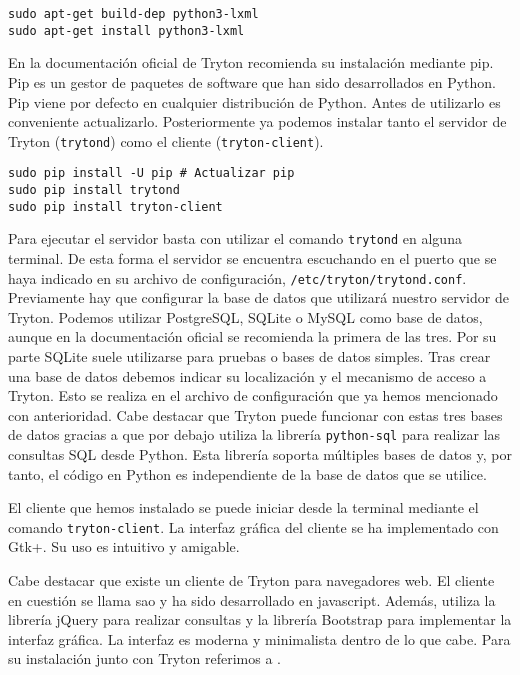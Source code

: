 \documentclass{article}
\begin{document}
\begin{verbatim}
sudo apt-get build-dep python3-lxml
sudo apt-get install python3-lxml
\end{verbatim}

En la documentación oficial de Tryton recomienda su instalación mediante pip. Pip es un gestor de paquetes de software que han sido desarrollados en Python.  Pip viene por defecto en cualquier distribución de Python. Antes de utilizarlo es conveniente actualizarlo. Posteriormente ya podemos instalar tanto el servidor de Tryton (\texttt{trytond}) como el cliente (\texttt{tryton-client}).

\begin{verbatim}
sudo pip install -U pip # Actualizar pip
sudo pip install trytond
sudo pip install tryton-client
\end{verbatim}

Para ejecutar el servidor basta con utilizar el comando \texttt{trytond} en alguna terminal. De esta forma el servidor se encuentra escuchando en el puerto que se haya indicado en su archivo de configuración, \texttt{/etc/tryton/trytond.conf}. Previamente hay que configurar la base de datos que utilizará nuestro servidor de Tryton. Podemos utilizar PostgreSQL, SQLite o MySQL como base de datos, aunque en la documentación oficial se recomienda la primera de las tres. Por su parte SQLite suele utilizarse para pruebas o bases de datos simples. Tras crear una base de datos debemos indicar su localización y el mecanismo de acceso a Tryton. Esto se realiza en el archivo de configuración que ya hemos mencionado con anterioridad. Cabe destacar que Tryton puede funcionar con estas tres bases de datos gracias a que por debajo utiliza la librería \texttt{python-sql} para realizar las consultas SQL desde Python. Esta librería soporta múltiples bases de datos y, por tanto, el código en Python es independiente de la base de datos que se utilice.

El cliente que hemos instalado se puede iniciar desde la terminal mediante el comando \texttt{tryton-client}. La interfaz gráfica del cliente se ha implementado con Gtk+. Su uso es intuitivo y amigable.

Cabe destacar que existe un cliente de Tryton para navegadores web. El cliente en cuestión se llama sao y ha sido desarrollado en javascript. Además, utiliza la librería jQuery para realizar consultas y la librería Bootstrap para implementar la interfaz gráfica. La interfaz es moderna y minimalista dentro de lo que cabe. Para su instalación junto con Tryton referimos a \cite{sao}.
\end{document}
